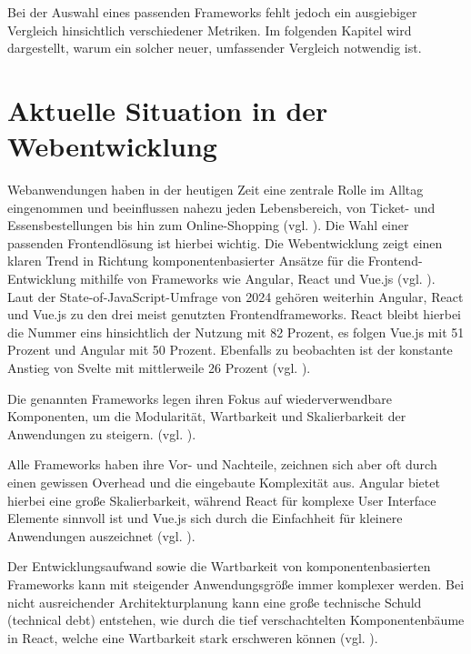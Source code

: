 \documentclass[oneside]{ausarbeitung}
\begin{document}
Bei der Auswahl eines passenden Frameworks fehlt jedoch ein ausgiebiger Vergleich hinsichtlich verschiedener Metriken. Im folgenden Kapitel wird dargestellt, warum ein solcher neuer, umfassender Vergleich notwendig ist.

\section{Aktuelle Situation in der Webentwicklung}

Webanwendungen haben in der heutigen Zeit eine zentrale Rolle im Alltag eingenommen und beeinflussen nahezu jeden Lebensbereich, von Ticket- und Essensbestellungen bis hin zum Online-Shopping (vgl. \autocite[S. 298]{spa-frameworks-2024}). Die Wahl einer passenden Frontendlösung ist hierbei wichtig. 
Die Webentwicklung zeigt einen klaren Trend in Richtung komponentenbasierter Ansätze für die Frontend-Entwicklung mithilfe von Frameworks wie Angular, React und Vue.js (vgl. \parencite[S. 43]{js-framework-comparison}). Laut der State-of-JavaScript-Umfrage von 2024 gehören weiterhin Angular, React und Vue.js zu den drei meist genutzten Frontendframeworks. React bleibt hierbei die Nummer eins hinsichtlich der Nutzung mit 82 Prozent, es folgen Vue.js mit 51 Prozent und Angular mit 50 Prozent. Ebenfalls zu beobachten ist der konstante Anstieg von Svelte mit mittlerweile 26 Prozent (vgl. \parencite {stateofjs2024}).

Die genannten Frameworks legen ihren Fokus auf wiederverwendbare Komponenten, um die Modularität, Wartbarkeit und Skalierbarkeit der Anwendungen zu steigern. (vgl. \autocite [S. 302,303]{spa-frameworks-2024}). 

Alle Frameworks haben ihre Vor- und Nachteile, zeichnen sich aber oft durch einen gewissen Overhead und die eingebaute Komplexität aus. Angular bietet hierbei eine große Skalierbarkeit, während React für komplexe User Interface Elemente sinnvoll ist und Vue.js sich durch die Einfachheit für kleinere Anwendungen auszeichnet (vgl. \parencite[S. 1070]{frontend_frameworks_comparison}). 

Der Entwicklungsaufwand sowie die Wartbarkeit von komponentenbasierten Frameworks kann mit steigender Anwendungsgröße immer komplexer werden. Bei nicht ausreichender Architekturplanung kann eine große technische Schuld (technical debt) entstehen, wie durch die tief verschachtelten Komponentenbäume in React, welche eine Wartbarkeit stark erschweren können (vgl. \parencite[S. 28,29]{comparison-frameworks-scalable-apps}).
\end{document}
